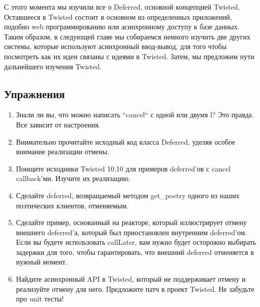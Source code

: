 С этого момента мы изучили все о Deferred, 
основной концепцией Twisted. Оставшееся в Twisted 
состоит в основном из определенных приложений, подобно 
web программированию или асинхронному доступу к базе 
данных. Таким образом, в следующей главе мы собираемся 
немного изучить две других системы, которые используют 
асинхронный ввод-вывод, для того чтобы посмотреть как 
их идеи связаны с идеями в Twisted. Затем, мы предложим пути 
дальнейшего изучения Twisted.


\subsection{Упражнения}

\begin{enumerate}

\item Знали ли вы, что можно написать ``cancel`` с одной или двумя l? Это правда. Все 
    зависит от настроения.

\item Внимательно прочитайте исходный код класса Deferred, 
    уделяя особое внимание реализации отмены.

\item Поищите исходники Twisted 10.10 для примеров deferred'ов 
    с cancel callback'ми. Изучите их реализацию.

\item Сделайте deferred, возвращаемый методом get\_poetry одного из 
    наших поэтических клиентов, отменяемым.

\item Сделайте пример, основанный на реакторе, который иллюстрирует 
    отмену внешнего deferred'а, который был приостановлен внутренним 
    deferred'ом. Если вы будете использовать callLater, вам нужно будет 
    осторожно выбирать задержки для того, чтобы гарантировать, что 
    внешний deferred отменяется в нужный момент.

\item Найдите асинхронный API в Twisted, который не 
    поддерживает отмену и реализуйте отмену 
    для него. Предложите патч в проект Twisted. Не забудьте про unit тесты!

\end{enumerate}




